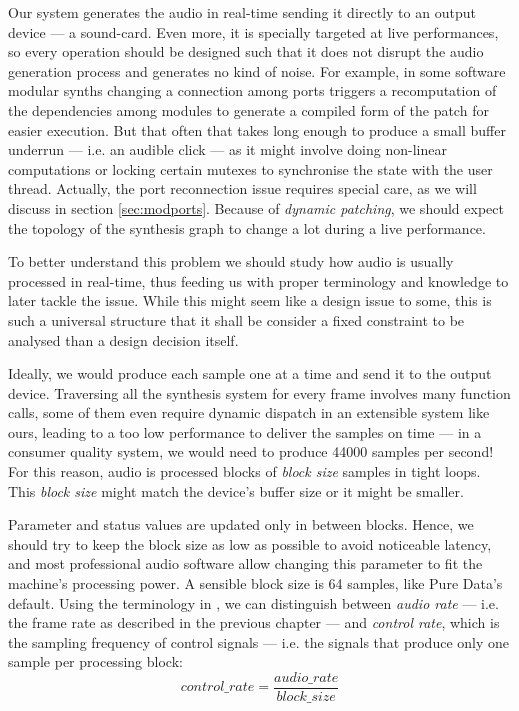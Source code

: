 Our system generates the audio in real-time sending
it directly to an output device --- a sound-card. Even more, it is
specially targeted at live performances, so every operation should be
designed such that it does not disrupt the audio generation process
and generates no kind of noise. For example, in some software modular
synths changing a connection among ports triggers a recomputation of
the dependencies among modules to generate a compiled form of the
patch for easier execution. But that often that takes long enough to
produce a small buffer underrun --- i.e. an audible
click --- as it might involve doing non-linear computations or locking
certain mutexes to synchronise the state with the user
thread. Actually, the port reconnection issue requires special care,
as we will discuss in section \ref{sec:modports}. Because of
\emph{dynamic patching}, we should expect the
topology of the synthesis graph to change a lot during a live
performance.

To better understand this problem we should study how audio is
usually processed in real-time, thus feeding us with proper
terminology and knowledge to later tackle the issue. While this might
seem like a design issue to some, this is such a universal structure
that it shall be consider a fixed constraint to be analysed than a
design decision itself.

Ideally, we would produce each sample one at a time and send it to the
output device.  Traversing all the synthesis system for every frame
involves many function calls, some of them even require dynamic
dispatch in an extensible system like ours, leading to a too low
performance to deliver the samples on time --- in a consumer quality
system, we would need to produce 44000 samples per second! For this
reason, audio is processed blocks of \emph{block size} samples in
tight loops. This \emph{block size} might match the
device's buffer size or it might be
smaller. 

Parameter and status values are updated only in between blocks. Hence,
we should try to keep the block size as low as possible to avoid
noticeable latency, and most professional audio software allow
changing this parameter to fit the machine's processing power. A
sensible block size is 64 samples, like Pure Data's default. Using the
terminology in \cite{boulanger10audio}, we can distinguish between
\emph{audio rate} --- i.e. the frame rate as
described in the previous chapter --- and \emph{control
  rate}, which is the sampling frequency of
control signals --- i.e. the signals that produce only one sample per
processing block:
\begin{equation}
  control\_rate = \frac{audio\_rate}{block\_size}  
\end{equation}

